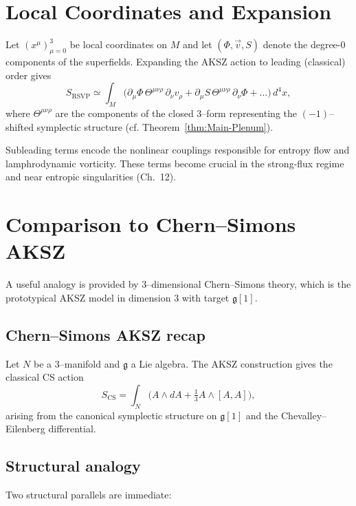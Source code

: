 \section{Local Coordinates and Expansion}
\label{sec:local-coords}

Let $(x^{\mu})_{\mu=0}^{3}$ be local coordinates on $M$ and
let $(\Phi,\vec v,S)$ denote the degree-$0$ components of the superfields.
Expanding the AKSZ action to leading (classical) order gives
\begin{equation}
\label{eq:local-RSVP}
S_{\mathrm{RSVP}} \simeq
\int_{M} \Big(
\partial_{\mu}\Phi \, \Theta^{\mu\nu\rho}
\, \partial_{\nu} v_{\rho}
+ \partial_{\mu}S \, \Theta^{\mu\nu\rho}
\, \partial_{\nu} \Phi
+ \dots
\Big)\, d^{4}x,
\end{equation}
where $\Theta^{\mu\nu\rho}$ are the components of the closed
$3$--form representing the $(-1)$--shifted symplectic structure
(cf. Theorem~\ref{thm:Main-Plenum}).

\begin{remark}
Subleading terms encode the nonlinear couplings responsible for
entropy flow and lamphrodynamic vorticity. These terms become crucial
in the strong-flux regime and near entropic singularities (Ch.~12).
\end{remark}



\section{Comparison to Chern--Simons AKSZ}
\label{sec:CS-comparison}

A useful analogy is provided by $3$--dimensional Chern--Simons theory,
which is the prototypical AKSZ model in dimension $3$ with target
$\mathfrak{g}[1]$.

\subsection{Chern--Simons AKSZ recap}
Let $N$ be a $3$--manifold and $\mathfrak{g}$ a Lie algebra.
The AKSZ construction gives the classical CS action
\[
S_{\mathrm{CS}} = \int_{N}
\Big( A\wedge dA + \tfrac{1}{3}A\wedge [A,A] \Big),
\]
arising from the canonical symplectic structure on $\mathfrak{g}[1]$
and the Chevalley--Eilenberg differential.

\subsection{Structural analogy}
Two structural parallels are immediate:

